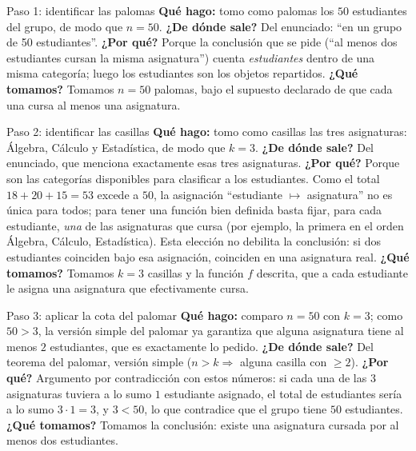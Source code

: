 \documentclass[11pt]{article}
\begin{document}
\begin{sol}

\begin{paso}{Paso 1: identificar las palomas}
\textbf{Qu\'e hago:} tomo como palomas los $50$ estudiantes del grupo, de modo que $n=50$.
\textbf{¿De d\'onde sale?} Del enunciado: ``en un grupo de 50 estudiantes''.
\textbf{¿Por qu\'e?} Porque la conclusi\'on que se pide (``al menos dos estudiantes cursan la misma asignatura'') cuenta \emph{estudiantes} dentro de una misma categor\'ia; luego los estudiantes son los objetos repartidos.
\textbf{¿Qu\'e tomamos?} Tomamos $n=50$ palomas, bajo el supuesto declarado de que cada una cursa al menos una asignatura.
\end{paso}

\begin{paso}{Paso 2: identificar las casillas}
\textbf{Qu\'e hago:} tomo como casillas las tres asignaturas: \'Algebra, C\'alculo y Estad\'istica, de modo que $k=3$.
\textbf{¿De d\'onde sale?} Del enunciado, que menciona exactamente esas tres asignaturas.
\textbf{¿Por qu\'e?} Porque son las categor\'ias disponibles para clasificar a los estudiantes. Como el total $18+20+15=53$ excede a $50$, la asignaci\'on ``estudiante $\mapsto$ asignatura'' no es \'unica para todos; para tener una funci\'on bien definida basta fijar, para cada estudiante, \emph{una} de las asignaturas que cursa (por ejemplo, la primera en el orden \'Algebra, C\'alculo, Estad\'istica). Esta elecci\'on no debilita la conclusi\'on: si dos estudiantes coinciden bajo esa asignaci\'on, coinciden en una asignatura real.
\textbf{¿Qu\'e tomamos?} Tomamos $k=3$ casillas y la funci\'on $f$ descrita, que a cada estudiante le asigna una asignatura que efectivamente cursa.
\end{paso}

\begin{paso}{Paso 3: aplicar la cota del palomar}
\textbf{Qu\'e hago:} comparo $n=50$ con $k=3$; como $50>3$, la versi\'on simple del palomar ya garantiza que alguna asignatura tiene al menos $2$ estudiantes, que es exactamente lo pedido.
\textbf{¿De d\'onde sale?} Del teorema del palomar, versi\'on simple ($n>k \Rightarrow$ alguna casilla con $\ge 2$).
\textbf{¿Por qu\'e?} Argumento por contradicci\'on con estos n\'umeros: si cada una de las $3$ asignaturas tuviera a lo sumo $1$ estudiante asignado, el total de estudiantes ser\'ia a lo sumo $3\cdot 1 = 3$, y $3<50$, lo que contradice que el grupo tiene $50$ estudiantes.
\textbf{¿Qu\'e tomamos?} Tomamos la conclusi\'on: existe una asignatura cursada por al menos dos estudiantes.
\end{paso}


\end{sol}
\end{document}
